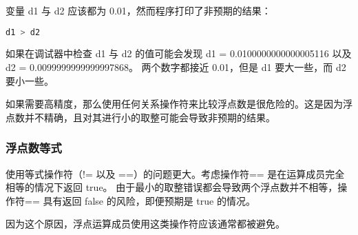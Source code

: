 \documentclass[../../LearnCpp.tex]{subfiles}
\begin{document}
变量 d1 与 d2 应该都为 0.01，然而程序打印了非预期的结果：

\begin{lstlisting}[language=C++]
d1 > d2
\end{lstlisting}

如果在调试器中检查 d1 与 d2 的值可能会发现 d1 = 0.0100000000000005116 以及 d2 = 0.0099999999999997868。
两个数字都接近 0.01，但是 d1 要大一些，而 d2 要小一些。

如果需要高精度，那么使用任何关系操作符来比较浮点数是很危险的。这是因为浮点数并不精确，且对其进行小的取整可能会导致非预期的结果。

\subsubsection*{浮点数等式}

使用等式操作符（!= 以及 ==）的问题更大。考虑操作符== 是在运算成员完全相等的情况下返回 true。
由于最小的取整错误都会导致两个浮点数并不相等，操作符== 具有返回 false 的风险，即便预期是 true 的情况。

因为这个原因，浮点运算成员使用这类操作符应该通常都被避免。
\end{document}
